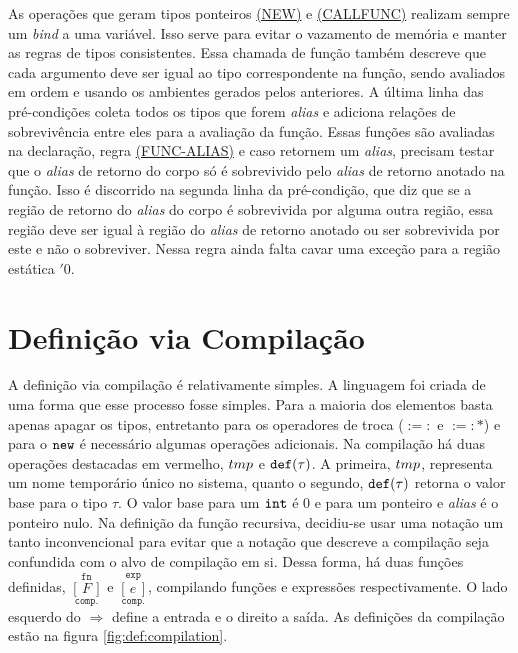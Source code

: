 As operações que geram tipos ponteiros \hyperref[trule:new]{(NEW)} e \hyperref[trule:callfunc]{(CALLFUNC)} realizam sempre um \emph{bind} a uma variável. Isso serve para evitar o vazamento de memória e manter as regras de tipos consistentes. Essa chamada de função também descreve que cada argumento deve ser igual ao tipo correspondente na função, sendo avaliados em ordem e usando os ambientes gerados pelos anteriores. A última linha das pré-condições coleta todos os tipos que forem \emph{alias} e adiciona relações de sobrevivência entre eles para a avaliação da função. Essas funções são avaliadas na declaração, regra \hyperref[trule:func-alias]{(FUNC-ALIAS)} e caso retornem um \emph{alias}, precisam testar que o \emph{alias} de retorno do corpo só é sobrevivido pelo \emph{alias} de retorno anotado na função. Isso é discorrido na segunda linha da pré-condição, que diz que se a região de retorno do \emph{alias} do corpo é sobrevivida por alguma outra região, essa região deve ser igual à região do \emph{alias} de retorno anotado ou ser sobrevivida por este e não o sobreviver. Nessa regra ainda falta cavar uma exceção para a região estática $'0$.

\section{Definição via Compilação}
\label{chap5:compile}

\newcommand{\compf}[1]{\overset{\texttt{fn}}{\underset{\texttt{comp.}}{[\,#1\,]}}}
\newcommand{\compe}[1]{\overset{\texttt{exp}}{\underset{\texttt{comp.}}{[\,#1\,]}}}
\newcommand{\TMP}{{\color{red}tmp}}
\newcommand{\DEF}{{\color{red}\FN{def}({\color{black}\tau})}}

A definição via compilação é relativamente simples. A linguagem foi criada de uma forma que esse processo fosse simples. Para a maioria dos elementos basta apenas apagar os tipos, entretanto para os operadores de troca ($:=:$ e $:=:\!\!\text{*}$) e para o $\texttt{new}$ é necessário algumas operações adicionais. Na compilação há duas operações destacadas em vermelho, $\TMP$ e $\DEF$. A primeira, $\TMP$, representa um nome temporário único no sistema, quanto o segundo, $\DEF$ retorna o valor base para o tipo $\tau$. O valor base para um $\texttt{int}$ é 0 e para um ponteiro e \emph{alias} é o ponteiro nulo. Na definição da função recursiva, decidiu-se usar uma notação um tanto inconvencional para evitar que a notação que descreve a compilação seja confundida com o alvo de compilação em si. Dessa forma, há duas funções definidas, $\compf{F}$ e $\compe{e}$, compilando funções e expressões respectivamente. O lado esquerdo do $\Rightarrow$ define a entrada e o direito a saída. As definições da compilação estão na figura \ref{fig:def:compilation}.

